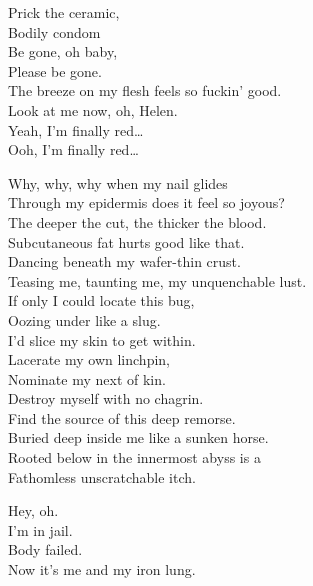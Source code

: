 Prick the ceramic, \\
Bodily condom \\
Be gone, oh baby, \\
Please be gone. \\
The breeze on my flesh feels so fuckin' good. \\
Look at me now, oh, Helen. \\
Yeah, I'm finally red… \\
Ooh, I'm finally red… \\


Why, why, why when my nail glides \\
Through my epidermis does it feel so joyous? \\
The deeper the cut, the thicker the blood. \\
Subcutaneous fat hurts good like that. \\

Dancing beneath my wafer-thin crust. \\
Teasing me, taunting me, my unquenchable lust. \\
If only I could locate this bug, \\
Oozing under like a slug. \\

I'd slice my skin to get within. \\
Lacerate my own linchpin, \\
Nominate my next of kin. \\
Destroy myself with no chagrin. \\

Find the source of this deep remorse. \\
Buried deep inside me like a sunken horse. \\
Rooted below in the innermost abyss is a \\
Fathomless unscratchable itch. \\





Hey, oh. \\
I'm in jail. \\
Body failed. \\
Now it's me and my iron lung. \\

